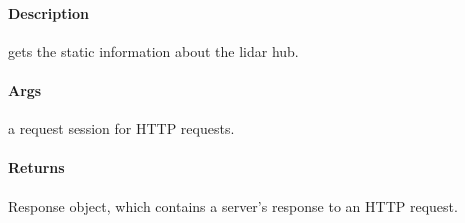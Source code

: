 \documentclass[letterpaper,10pt,english]{sphinxmanual}
\begin{document}
\begin{fulllineitems}
\label{\detokenize{gemini_lidar_hub_API:gemini_lidar_hub_API.get_lidar_hub_info}}
\pysigstartsignatures
{}
\pysigstopsignatures

\paragraph{Description}
\label{\detokenize{gemini_lidar_hub_API:id29}}
\sphinxAtStartPar
gets the static information about the lidar hub.


\paragraph{Args}
\label{\detokenize{gemini_lidar_hub_API:id30}}\begin{description}
\sphinxAtStartPar
a request session for HTTP requests.

\end{description}


\paragraph{Returns}
\label{\detokenize{gemini_lidar_hub_API:id31}}\begin{description}
\sphinxAtStartPar
Response object, which contains a server’s response to an HTTP request.

\end{description}

\end{fulllineitems}

\end{document}
